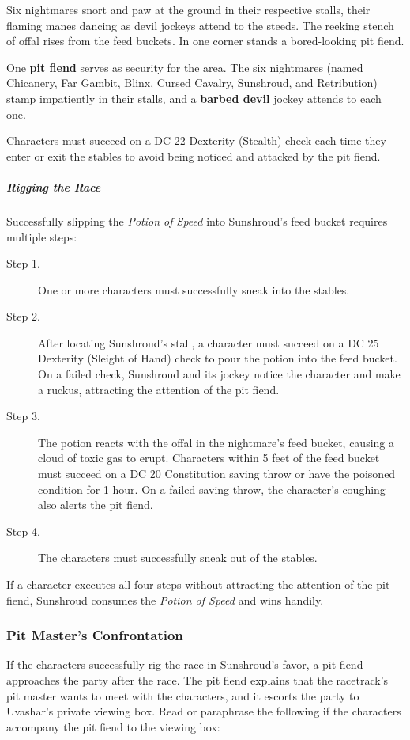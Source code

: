 \documentclass[10pt,a4paper,twoside,bg=print,twocolumn,openany,nodeprecatedcode]{dndbook}
\begin{document}
\begin{DndReadAloud}{}
Six nightmares snort and paw at the ground in their respective stalls, their flaming manes dancing as devil jockeys attend to the steeds. The reeking stench of offal rises from the feed buckets. In one corner stands a bored-looking pit fiend.

\end{DndReadAloud}

One \textbf{pit fiend} serves as security for the area. The six nightmares (named Chicanery, Far Gambit, Blinx, Cursed Cavalry, Sunshroud, and Retribution) stamp impatiently in their stalls, and a \textbf{barbed devil} jockey attends to each one.

Characters must succeed on a DC 22 Dexterity (Stealth) check each time they enter or exit the stables to avoid being noticed and attacked by the pit fiend.

\subparagraph{Rigging the Race}
Successfully slipping the \textit{Potion of Speed} into Sunshroud's feed bucket requires multiple steps:


\begin{description}
\item[Step 1.]
One or more characters must successfully sneak into the stables.
\item[Step 2.]
After locating Sunshroud's stall, a character must succeed on a DC 25 Dexterity (Sleight of Hand) check to pour the potion into the feed bucket. On a failed check, Sunshroud and its jockey notice the character and make a ruckus, attracting the attention of the pit fiend.
\item[Step 3.]
The potion reacts with the offal in the nightmare's feed bucket, causing a cloud of toxic gas to erupt. Characters within 5 feet of the feed bucket must succeed on a DC 20 Constitution saving throw or have the poisoned condition for 1 hour. On a failed saving throw, the character's coughing also alerts the pit fiend.
\item[Step 4.]
The characters must successfully sneak out of the stables.
\end{description}

If a character executes all four steps without attracting the attention of the pit fiend, Sunshroud consumes the \textit{Potion of Speed} and wins handily.

\subsubsection{Pit Master's Confrontation}
If the characters successfully rig the race in Sunshroud's favor, a pit fiend approaches the party after the race. The pit fiend explains that the racetrack's pit master wants to meet with the characters, and it escorts the party to Uvashar's private viewing box. Read or paraphrase the following if the characters accompany the pit fiend to the viewing box:
\end{document}
